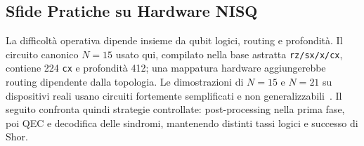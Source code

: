 \begin{onehalfspace}
\section{Sfide Pratiche su Hardware NISQ}

La difficoltà operativa dipende insieme da qubit logici, routing e profondità.
Il circuito canonico $N=15$ usato qui, compilato nella base astratta
\texttt{rz/sx/x/cx}, contiene 224 \texttt{cx} e profondità 412; una mappatura
hardware aggiungerebbe routing dipendente dalla topologia. Le dimostrazioni di
$N=15$ e $N=21$ su dispositivi reali usano circuiti fortemente semplificati e
non generalizzabili~\cite{skosana2021}. Il seguito confronta quindi strategie
controllate: post-processing nella prima fase, poi \ac{QEC} e decodifica delle
sindromi, mantenendo distinti tassi logici e successo di Shor.

\end{onehalfspace}
